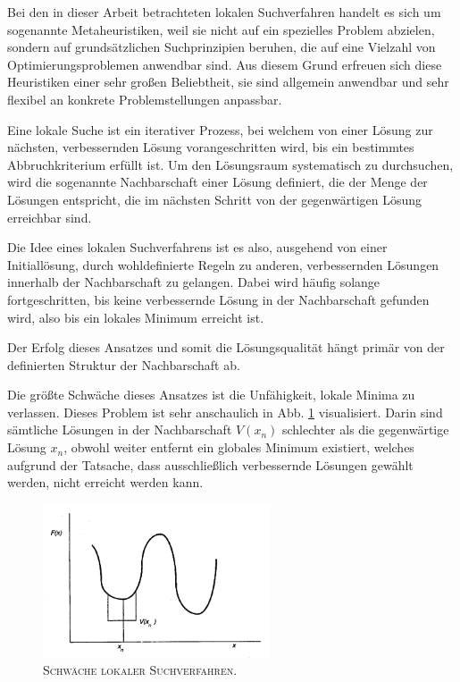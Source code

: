 Bei den in dieser Arbeit betrachteten lokalen Suchverfahren handelt es sich um sogenannte Metaheuristiken,
weil sie nicht auf ein spezielles Problem abzielen, sondern auf grundsätzlichen Suchprinzipien beruhen,
die auf eine Vielzahl von Optimierungsproblemen anwendbar sind.
Aus diesem Grund erfreuen sich diese Heuristiken einer sehr großen Beliebtheit,
sie sind allgemein anwendbar und sehr flexibel an konkrete Problemstellungen anpassbar.

Eine lokale Suche ist ein iterativer Prozess, bei welchem von einer Lösung zur nächsten, verbessernden Lösung vorangeschritten wird,
bis ein bestimmtes Abbruchkriterium erfüllt ist. Um den Lösungsraum systematisch zu durchsuchen, wird die
sogenannte Nachbarschaft einer Lösung definiert, die der Menge der Lösungen entspricht, die im nächsten Schritt
von der gegenwärtigen Lösung erreichbar sind. \cite{Brucker2006}

Die Idee eines lokalen Suchverfahrens ist es also, ausgehend von einer Initiallösung, durch wohldefinierte Regeln zu anderen,
verbessernden Lösungen innerhalb der Nachbarschaft zu gelangen.
Dabei wird häufig solange fortgeschritten, bis keine verbessernde Lösung in der Nachbarschaft gefunden wird,
also bis ein lokales Minimum erreicht ist.

Der Erfolg dieses Ansatzes und somit die Lösungsqualität hängt primär von der definierten Struktur der Nachbarschaft ab. \cite{Pirlot1996}

Die größte Schwäche dieses Ansatzes ist die Unfähigkeit, lokale Minima zu verlassen. Dieses Problem ist sehr
anschaulich in Abb. \ref{fig:local_search_weakness} visualisiert. Darin sind sämtliche Lösungen in der Nachbarschaft $V(x_n)$ schlechter
als die gegenwärtige Lösung $x_n$, obwohl weiter entfernt ein globales Minimum existiert, welches
aufgrund der Tatsache, dass ausschließlich verbessernde Lösungen gewählt werden, nicht erreicht werden kann.

\begin{figure}[H]
\centering
\includegraphics[width=0.6\textwidth]{img/local_minimum.png}
\caption{\textsc{Schwäche lokaler Suchverfahren. \cite{Pirlot1996}}}
\label{fig:local_search_weakness}
\end{figure}

